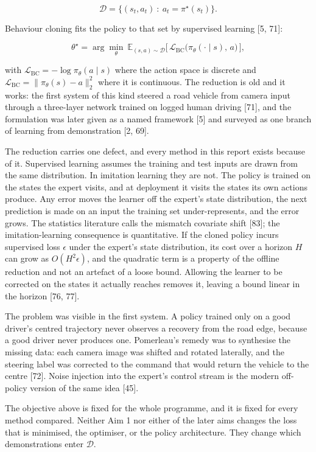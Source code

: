 \documentclass[
  11pt,
]{article}
\begin{document}
\[\mathcal{D} = \big\{ (s_t, a_t) \ : \ a_t = \pi^\star(s_t) \big\}.\]

Behaviour cloning fits the policy to that set by supervised learning
{[}5, 71{]}:

\[\theta^\star = \arg\min_\theta \ \mathbb{E}_{(s,a) \sim \mathcal{D}} \Big[\, \mathcal{L}_{\mathrm{BC}}\big(\pi_\theta(\cdot \mid s),\, a\big) \,\Big],\]

with \(\mathcal{L}_{\mathrm{BC}} = -\log \pi_\theta(a \mid s)\) where
the action space is discrete and
\(\mathcal{L}_{\mathrm{BC}} = \lVert \pi_\theta(s) - a \rVert_2^2\)
where it is continuous. The reduction is old and it works: the first
system of this kind steered a road vehicle from camera input through a
three-layer network trained on logged human driving {[}71{]}, and the
formulation was later given as a named framework {[}5{]} and surveyed as
one branch of learning from demonstration {[}2, 69{]}.

The reduction carries one defect, and every method in this report exists
because of it. Supervised learning assumes the training and test inputs
are drawn from the same distribution. In imitation learning they are
not. The policy is trained on the states the expert visits, and at
deployment it visits the states its own actions produce. Any error moves
the learner off the expert's state distribution, the next prediction is
made on an input the training set under-represents, and the error grows.
The statistics literature calls the mismatch covariate shift {[}83{]};
the imitation-learning consequence is quantitative. If the cloned policy
incurs supervised loss \(\epsilon\) under the expert's state
distribution, its cost over a horizon \(H\) can grow as
\(O(H^2 \epsilon)\), and the quadratic term is a property of the offline
reduction and not an artefact of a loose bound. Allowing the learner to
be corrected on the states it actually reaches removes it, leaving a
bound linear in the horizon {[}76, 77{]}.

The problem was visible in the first system. A policy trained only on a
good driver's centred trajectory never observes a recovery from the road
edge, because a good driver never produces one. Pomerleau's remedy was
to synthesise the missing data: each camera image was shifted and
rotated laterally, and the steering label was corrected to the command
that would return the vehicle to the centre {[}72{]}. Noise injection
into the expert's control stream is the modern off-policy version of the
same idea {[}45{]}.

The objective above is fixed for the whole programme, and it is fixed
for every method compared. Neither Aim 1 nor either of the later aims
changes the loss that is minimised, the optimiser, or the policy
architecture. They change which demonstrations enter \(\mathcal{D}\).
\end{document}
